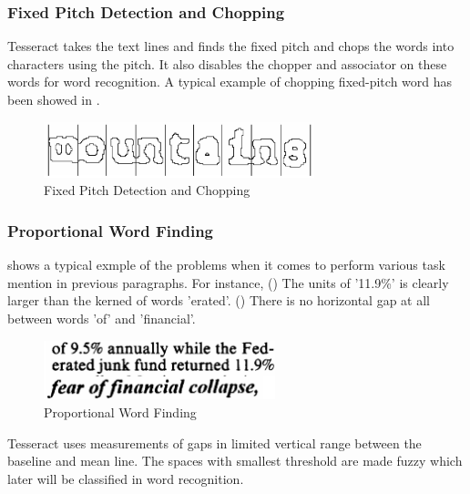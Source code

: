 \subsubsection{Fixed Pitch Detection and Chopping}

Tesseract takes the text lines and finds the fixed pitch and chops the words into characters using the pitch. It also disables the chopper and associator on these words for word recognition. A typical example of chopping fixed-pitch word has been showed in .

\begin{figure}[ht]
    \centering
    \includegraphics[width=0.7\textwidth]{chapters/images/OCR/Fixed_Pitch_detection.JPG}
    \caption{Fixed Pitch Detection and Chopping\cite{AnOverviewoftheTesseractOCREngine}}
    \label{fig:Fixed_Pitch_detection}
\end{figure}

\subsubsection{Proportional Word Finding}

 shows a typical exmple of the problems when it comes to perform various task mention in previous paragraphs. For instance, () The units of '11.9\%' is clearly larger than the kerned of words 'erated'. () There is no horizontal gap at all between words 'of' and 'financial'.

\begin{figure}[ht]
    \centering
    \includegraphics[width=0.6\textwidth]{chapters/images/OCR/Word_Finding.JPG}
    \caption{Proportional Word Finding\cite{AnOverviewoftheTesseractOCREngine}}
    \label{fig:Proportional_Word_Finding}
\end{figure}

Tesseract uses measurements of gaps in limited vertical range between the baseline and mean line. The spaces with smallest threshold are made fuzzy which later will be classified in word recognition.



